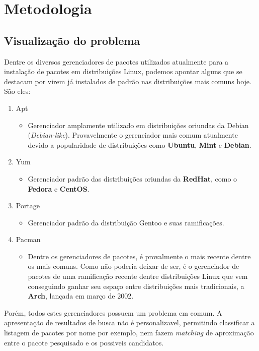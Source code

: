\section{Metodologia} %
\label{sec:metodologia}


\subsection{Visualização do problema} %
\label{sub:visualiza_o_do_problema}

Dentre os diversos gerenciadores de pacotes utilizados atualmente para a instalação de pacotes em distribuições Linux, podemos apontar alguns que se destacam por virem já instalados de padrão nas distribuições mais comuns hoje. São eles:

\begin{enumerate}
	\item Apt
	\begin{itemize}
		\item Gerenciador amplamente utilizado em distribuições oriundas da Debian (\textit{Debian-like}). Provavelmente o gerenciador mais comum atualmente devido a popularidade de distribuições como \textbf{Ubuntu}, \textbf{Mint} e \textbf{Debian}.
	\end{itemize}
	\item Yum
	\begin{itemize}
		\item Gerenciador padrão  das distribuições oriundas da \textbf{RedHat}, como o \textbf{Fedora} e \textbf{CentOS}.
	\end{itemize}
	\item Portage
	\begin{itemize}
		\item Gerenciador padrão da distribuição Gentoo e suas ramificações.
	\end{itemize}
	\item Pacman
	\begin{itemize}
		\item Dentre os gerenciadores de pacotes, é provalmente o mais recente dentre os mais comuns. Como não poderia deixar de ser, é  o gerenciador de pacotes de uma ramificação recente dentre distribuições Linux que vem conseguindo ganhar seu espaço entre distribuições mais tradicionais, a \textbf{Arch}, lançada em março de 2002.
	\end{itemize}
\end{enumerate}

Porém, todos estes gerenciadores possuem um problema em comum. A apresentação de resultados de busca não é personalizavel, permitindo classificar a listagem de pacotes por nome por exemplo, nem fazem \textit{matching} de aproximação  entre o pacote pesquisado e os possiveis candidatos.

